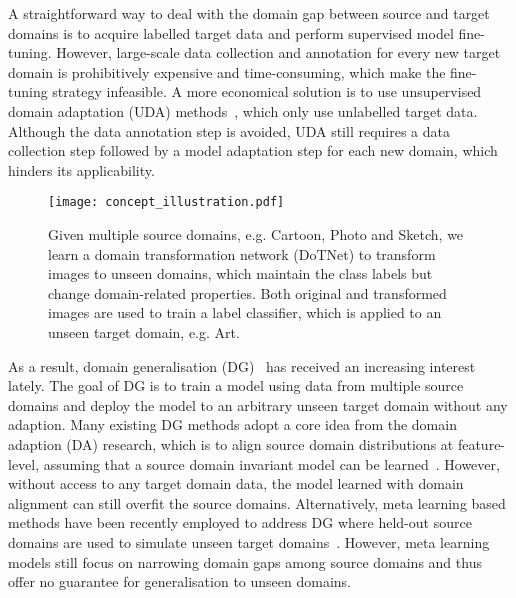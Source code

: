 \documentclass[letterpaper]{article}
\begin{document}
A straightforward way to deal with the domain gap between source and target domains is to acquire labelled target data and perform supervised model fine-tuning. However, large-scale data collection and annotation for every new target domain is prohibitively expensive and time-consuming, which make the fine-tuning strategy infeasible. A more economical solution is to use unsupervised domain adaptation (UDA) methods~\cite{long2015learning,ganin2015unsupervised,hoffman2018cycada,cvpr19dlow,chen2019trans}, which only use unlabelled target data. Although the data annotation step is avoided, UDA still requires a data collection step followed by a model adaptation step for each new domain, which hinders its applicability.


\begin{figure}[t]
    \centering
    \texttt{[image: concept\_illustration.pdf]}
    \caption{\small Given multiple source domains, e.g. Cartoon, Photo and Sketch, we learn a domain transformation network (DoTNet) to transform images to unseen domains, which maintain the class labels but change domain-related properties. Both original and transformed images are used to train a label classifier, which is applied to an unseen target domain, e.g. Art.}
    \label{fig:concept_illustration}
    \vspace{-0.2cm}
\end{figure}


As a result, domain generalisation (DG)~\cite{muandet2013domain} has received an increasing interest lately. The goal of DG is to train a model using data from multiple source domains and deploy the model to an arbitrary unseen target domain without any adaption. Many existing DG methods adopt a core idea from the domain adaption (DA) research, which is to align source domain distributions at feature-level, assuming that a source domain invariant model can be learned~\cite{li2018mmdaae,li2018ciddg}. However, without access to any target domain data, the model learned with domain alignment can still overfit the source domains. Alternatively, meta learning based methods have been recently employed to address DG where held-out source domains are used to simulate unseen target domains~\cite{li2018learning,balaji2018metareg}. However, meta learning models still focus on narrowing domain gaps among source domains and thus offer no guarantee for generalisation to unseen domains.
\end{document}
